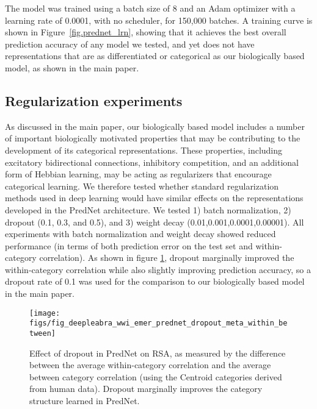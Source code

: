 \documentclass[12pt,twoside]{naturefigs}
\newif\myifpdf
\begin{document}
The model was trained using a batch size of 8 and an Adam optimizer with a learning rate of 0.0001, with no scheduler, for 150,000 batches.  A training curve is shown in Figure~\ref{fig.prednet_lrn}, showing that it achieves the best overall prediction accuracy of any model we tested, and yet does not have representations that are as differentiated or categorical as our biologically based model, as shown in the main paper.

\subsection{Regularization experiments}

As discussed in the main paper, our biologically based model includes a number of important biologically motivated properties that may be contributing to the development of its categorical representations. These properties, including excitatory bidirectional connections, inhibitory competition, and an additional form of Hebbian learning, may be acting as regularizers that encourage categorical learning. We therefore tested whether standard regularization methods used in deep learning would have similar effects on the representations developed in the PredNet architecture. We tested 1) batch normalization, 2) dropout (0.1, 0.3, and 0.5), and 3) weight decay (0.01,0.001,0.0001,0.00001). All experiments with batch normalization and weight decay showed reduced performance (in terms of both prediction error on the test set and within-category correlation). As shown in figure \ref{fig.prednet_dropout_within_between}, dropout marginally improved the within-category correlation while also slightly improving prediction accuracy, so a dropout rate of 0.1 was used for the comparison to our biologically based model in the main paper. 

\begin{figure}
  \centering\texttt{[image: figs/fig\_deepleabra\_wwi\_emer\_prednet\_dropout\_meta\_within\_between]}
  \caption{Effect of dropout in PredNet on RSA, as measured by the difference between the average within-category correlation and the average between category correlation (using the Centroid categories derived from human data). Dropout marginally improves the category structure learned in PredNet.}
  \label{fig.prednet_dropout_within_between}
\end{figure}


\end{document}
